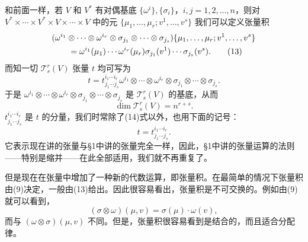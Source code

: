和前面一样，若 $V$ 和 $V^*$ 有对偶基底 $\{\omega^i\},\{\sigma_i\}$，$i,j=1,2,\ldots,n$，则对 $V^*\times\cdots\times V^*\times V\times\cdots\times V$ 中的元 $\{\mu_1,\ldots,\mu_r;v^1,\ldots,v^s\}$ 我们可以定义张量积
\begin{align}
 &(\omega^{i_1}\otimes\cdots\otimes\omega^{i_r}\otimes\sigma_{j_1}\otimes\cdots\otimes\sigma_{j_s})
 \{\mu_1,\ldots,\mu_r;v^1,\ldots,v^s\}
 \notag\\
 &\qquad=\omega^{i_1}(\mu_1)\cdots\omega^{i_r}(\mu_r)\sigma_{j_1}(v^1)\cdots\sigma_{j_s}(v^s).
 \tag{13}
\end{align}
而知一切 $\mathcal T^r_s(V)$ 张量 $t$ 均可写为
\begin{equation}
 t=t^{i_1\cdots i_r}_{j_1\cdots j_s}
 \omega^{i_1}\otimes\cdots\otimes\omega^{i_r}\otimes\sigma_{j_1}\otimes\cdots\otimes\sigma_{j_s}.
 \tag{14}
\end{equation}
于是 $\omega^{i_1}\otimes\cdots\otimes\omega^{i_r}\otimes\sigma_{j_1}\otimes\cdots\otimes\sigma_{j_s}$ 是 $\mathcal T^r_s(V)$ 的基底，从而
\begin{equation}
 \dim\mathcal T^r_s(V)=n^{r+s}.
 \tag{15}
\end{equation}
$t^{i_1\cdots i_r}_{j_1\cdots j_s}$ 是 $t$ 的分量，我们时常除了(14)式以外，也用下面的记号：
\begin{equation}
 t=t^{i_1\cdots i_r}_{j_1\cdots j_s}.
 \tag{16}
\end{equation}
它表示现在讲的张量与§1中讲的张量完全一样，因此，§1中讲的张量运算的法则——特别是缩并——在此全部适用，我们就不再重复了。

但是现在在张量中增加了一种新的代数运算，即张量积。在最简单的情况下张量积由(9)决定，一般由(13)给出。因此很容易看出，张量积是不可交换的。例如由(9)就可以看到，
\[
 (\sigma\otimes\omega)(\mu,v)=\sigma(\mu)\cdot\omega(v),
\]
而与 $(\omega\otimes\sigma)(\mu,v)$ 不同。但是，张量积很容易看到是结合的，而且适合分配律。

